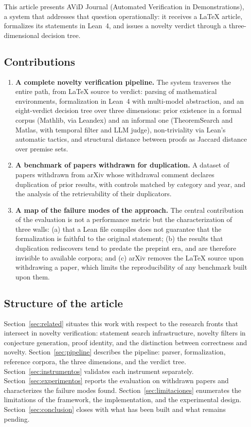 \documentclass[12pt,a4paper]{article}
\theoremstyle{remark}
\begin{document}
This article presents AViD Journal (Automated Verification in Demonstrations), a system that addresses that question operationally: it receives a LaTeX article, formalizes its statements in Lean~4, and issues a novelty verdict through a three-dimensional decision tree.

\subsection{Contributions}

\begin{enumerate}
\item \textbf{A complete novelty verification pipeline.} The system traverses the entire path, from LaTeX source to verdict: parsing of mathematical environments, formalization in Lean~4 with multi-model abstraction, and an eight-verdict decision tree over three dimensions: prior existence in a formal corpus (Mathlib, via Leandex) and an informal one (TheoremSearch and Matlas, with temporal filter and LLM judge), non-triviality via Lean's automatic tactics, and structural distance between proofs as Jaccard distance over premise sets.

\item \textbf{A benchmark of papers withdrawn for duplication.} A dataset of papers withdrawn from arXiv whose withdrawal comment declares duplication of prior results, with controls matched by category and year, and the analysis of the retrievability of their duplicators.

\item \textbf{A map of the failure modes of the approach.} The central contribution of the evaluation is not a performance metric but the characterization of three walls: (a) that a Lean file compiles does not guarantee that the formalization is faithful to the original statement; (b) the results that duplication rediscovers tend to predate the preprint era, and are therefore invisible to available corpora; and (c) arXiv removes the LaTeX source upon withdrawing a paper, which limits the reproducibility of any benchmark built upon them.
\end{enumerate}

\subsection{Structure of the article}

Section~\ref{sec:related} situates this work with respect to the research fronts that intersect in novelty verification: statement search infrastructure, novelty filters in conjecture generation, proof identity, and the distinction between correctness and novelty. Section~\ref{sec:pipeline} describes the pipeline: parser, formalization, reference corpora, the three dimensions, and the verdict tree. Section~\ref{sec:instrumentos} validates each instrument separately. Section~\ref{sec:experimentos} reports the evaluation on withdrawn papers and characterizes the failure modes found. Section~\ref{sec:limitaciones} enumerates the limitations of the framework, the implementation, and the experimental design. Section~\ref{sec:conclusion} closes with what has been built and what remains pending.
\end{document}
